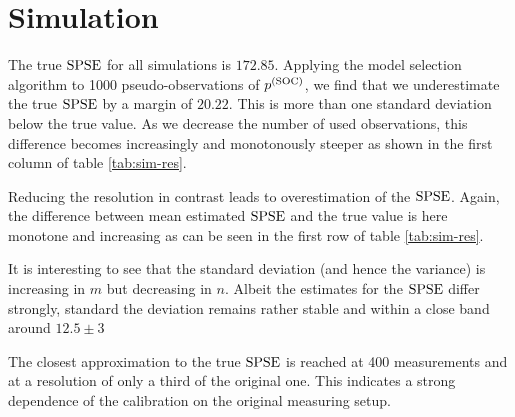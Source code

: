 \section{Simulation}
\label{sec:simulation}
	
	The true $\mathrm{SPSE}$ for all simulations is $172.85$. Applying the model selection algorithm to 1000 pseudo-observations of $p^{(\mathrm{SOC})}$, we find that we underestimate the true $\mathrm{SPSE}$ by a margin of $20.22$. 
	This is more than one standard deviation below the true value.
	As we decrease the number of used observations, this difference becomes increasingly and monotonously steeper as shown in the first column of table \ref{tab:sim-res}.
		
	
	
	Reducing the resolution in contrast leads to overestimation of the $\mathrm{SPSE}$.
	Again, the difference between mean estimated $\mathrm{SPSE}$ and the true value is here monotone and increasing as can be seen in the first row of table \ref{tab:sim-res}.
	
	It is interesting to see that the standard deviation (and hence the variance) is increasing in $m$ but decreasing in $n$.
	Albeit the estimates for the $\mathrm{SPSE}$ differ strongly, standard the deviation remains rather stable and within a close band around $12.5 \pm 3$
	
	The closest approximation to the true $\mathrm{SPSE}$ is reached at 400 measurements and at a resolution of only a third of the original one.
	This indicates a strong dependence of the calibration on the original measuring setup.

